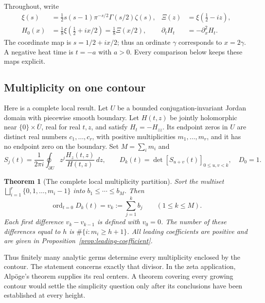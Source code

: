 \documentclass[11pt,a4paper]{article}
\newtheorem{theorem}{Theorem}[section]
\theoremstyle{definition}
\theoremstyle{remark}
\DeclareMathOperator{\ord}{ord}
\begin{document}
Throughout, write
\begin{align*}
 \xi(s)&=\tfrac12s(s-1)\pi^{-s/2}\Gamma(s/2)\zeta(s),
 &\Xi(z)&=\xi(\tfrac12-iz),\\
 H_0(x)&=\tfrac18\xi(\tfrac12+ix/2)=\tfrac18\Xi(x/2),
 &\partial_tH_t&=-\partial_x^2H_t.
\end{align*}
The coordinate map is $s=1/2+ix/2$; thus an ordinate $\gamma$ corresponds to $x=2\gamma$. A negative heat time is $t=-a$ with $a>0$. Every comparison below keeps these maps explicit.



\subsection{Multiplicity on one contour}
Here is a complete local result. Let $U$ be a bounded conjugation-invariant Jordan domain with piecewise smooth boundary. Let $H(t,z)$ be jointly holomorphic near $\{0\}\times\overline U$, real for real $t,z$, and satisfy $H_t=-H_{zz}$. Its endpoint zeros in $U$ are distinct real numbers $c_1,\ldots,c_r$, with positive multiplicities $m_1,\ldots,m_r$, and it has no endpoint zero on the boundary. Set $M=\sum_i m_i$ and
\[
 S_j(t)=\frac1{2\pi i}\oint_{\partial U}z^j\frac{H_z(t,z)}{H(t,z)}\,dz,
 \qquad D_k(t)=\det[S_{u+v}(t)]_{0\le u,v<k},\quad D_0=1.
\]
\begin{theorem}[The complete local multiplicity partition]\label{thm:local-orders}
Sort the multiset $\bigsqcup_{i=1}^r\{0,1,\ldots,m_i-1\}$ into $b_1\le\cdots\le b_M$. Then
\[
 \ord_{t=0}D_k(t)=v_k:=\sum_{j=1}^k b_j\qquad(1\le k\le M).
\]
Each first difference $v_k-v_{k-1}$ is defined with $v_0=0$. The number of these differences equal to $h$ is $\#\{i:m_i\ge h+1\}$. All leading coefficients are positive and are given in Proposition~\ref{prop:leading-coefficient}.
\end{theorem}
Thus finitely many analytic germs determine every multiplicity enclosed by the contour. The statement concerns exactly that divisor. In the zeta application, Alp\"oge's theorem supplies its real centers. A theorem covering every growing contour would settle the simplicity question only after its conclusions have been established at every height.
\end{document}
